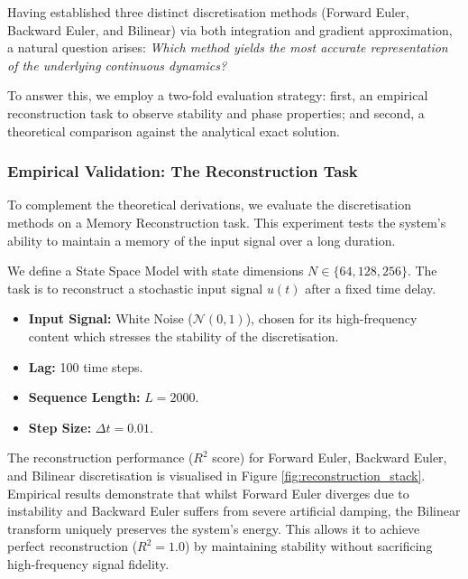 \documentclass[a4paper,11pt]{article}
\begin{document}
Having established three distinct discretisation methods (Forward Euler, Backward Euler, and Bilinear) via both integration and gradient approximation, a natural question arises: \textit{Which method yields the most accurate representation of the underlying continuous dynamics?} 

To answer this, we employ a two-fold evaluation strategy: first, an empirical reconstruction task to observe stability and phase properties; and second, a theoretical comparison against the analytical exact solution.

\subsubsection{Empirical Validation: The Reconstruction Task}
\label{sec:empirical_validation}

To complement the theoretical derivations, we evaluate the discretisation methods on a Memory Reconstruction task. This experiment tests the system's ability to maintain a memory of the input signal over a long duration.

We define a State Space Model with state dimensions $N \in \{64, 128, 256\}$. The task is to reconstruct a stochastic input signal $u(t)$ after a fixed time delay.
\begin{itemize}
    \item \textbf{Input Signal:} White Noise ($\mathcal{N}(0,1)$), chosen for its high-frequency content which stresses the stability of the discretisation.
    \item \textbf{Lag:} 100 time steps.
    \item \textbf{Sequence Length:} $L=2000$.
    \item \textbf{Step Size:} $\Delta t = 0.01$.
\end{itemize}

The reconstruction performance ($R^2$ score) for Forward Euler, Backward Euler, and Bilinear discretisation is visualised in Figure \ref{fig:reconstruction_stack}. Empirical results demonstrate that whilst Forward Euler diverges due to instability and Backward Euler suffers from severe artificial damping, the Bilinear transform uniquely preserves the system's energy. This allows it to achieve perfect reconstruction ($R^2=1.0$) by maintaining stability without sacrificing high-frequency signal fidelity.
\end{document}
